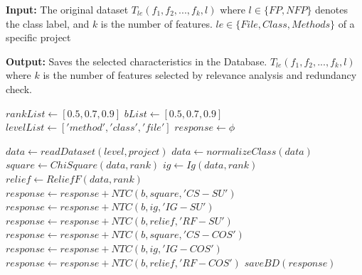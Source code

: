 \begin{algorithm}[H]
    \hspace*{\algorithmicindent} \textbf{Input:} The original dataset $T_{le}(f_{1},f_{2},...,f_{k},l)$ where $l \in \{FP,NFP\}$ denotes the class label, and $k$ is the number of features. $le \in \{File, Class, Methods\}$ of a specific project

    \hspace*{\algorithmicindent} \textbf{Output:} Saves the selected characteristics in the Database. $T_{le}(f_1,f_2,...,f_k,l)$ where $k$ is the number of features selected by relevance analysis and redundancy check.
    \caption{Feature selection}
    \label{alg:featureSelection}
    \begin{algorithmic}[1]
    \fontsize{12pt}{12pt}\selectfont
    \REQUIRE $rankList \leftarrow [0.5, 0.7, 0.9]$
    \STATE $bList \leftarrow [0.5, 0.7, 0.9]$
    \STATE $levelList \leftarrow ['method', 'class', 'file']$
    \STATE $response \leftarrow \phi$

                \STATE $data \leftarrow readDataset(level, project)$
                \STATE $data \leftarrow normalizeClass(data)$\;
                \STATE $square \leftarrow ChiSquare(data, rank)$\;
                \STATE $ig \leftarrow Ig(data, rank)$\;
                \STATE $relief \leftarrow ReliefF(data, rank)$\;
                \STATE $response \leftarrow response + NTC(b, square, 'CS-SU')$\;
                \STATE $response \leftarrow response + NTC(b, ig, 'IG-SU')$\;
                \STATE $response \leftarrow response + NTC(b, relief, 'RF-SU')$\;
                \STATE $response \leftarrow response + NTC(b, square, 'CS-COS')$\;
                \STATE $response \leftarrow response + NTC(b, ig, 'IG-COS')$\;
                \STATE $response \leftarrow response + NTC(b, relief, 'RF-COS')$\;
                \STATE $saveBD(response)$\;
            \ENDFOR
        \ENDFOR
    \ENDFOR
    \end{algorithmic}
\end{algorithm}